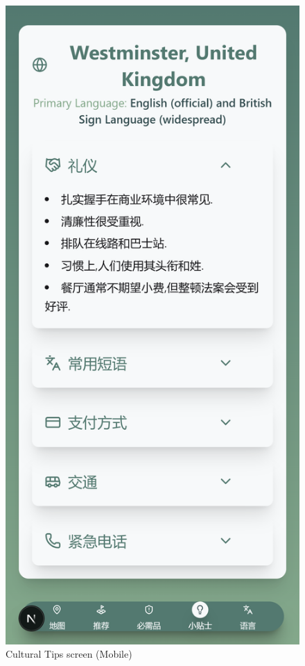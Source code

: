 \begin{figure}[H]
    \centering
    \includegraphics[height=0.3\textheight,keepaspectratio]{images/Screenshots/5_culturaltips_mobile.png}
    \caption{Cultural Tips screen (Mobile)}
\end{figure}

